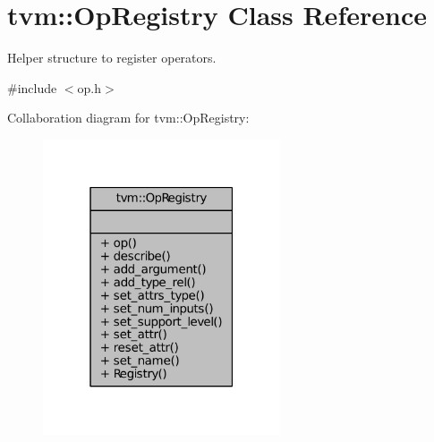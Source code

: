 \hypertarget{classtvm_1_1OpRegistry}{}\section{tvm\+:\+:Op\+Registry Class Reference}
\label{classtvm_1_1OpRegistry}


Helper structure to register operators.  




{\ttfamily \#include $<$op.\+h$>$}



Collaboration diagram for tvm\+:\+:Op\+Registry\+:
\nopagebreak
\begin{figure}[H]
\begin{center}
\leavevmode
\includegraphics[width=199pt]{classtvm_1_1OpRegistry__coll__graph}
\end{center}
\end{figure}
